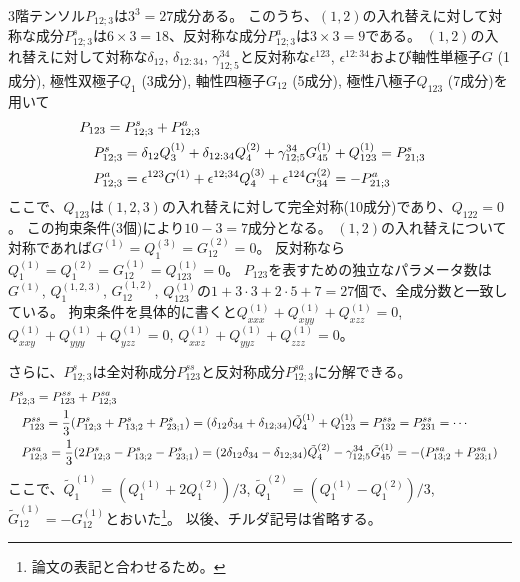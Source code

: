 \documentclass[11pt]{easymemo}
\begin{document}
3階テンソル$P_{12;3}$は$3^3=27$成分ある。
このうち、$(1,2)$の入れ替えに対して対称な成分$P_{12;3}^s$は$6\times3=18$、反対称な成分$P_{12;3}^a$は$3\times3=9$である。
$(1,2)$の入れ替えに対して対称な$\delta_{12}$, $\delta_{12:34}$, $\gamma_{12;5}^{34}$と反対称な$\epsilon^{123}$, $\epsilon^{12:34}$および軸性単極子$G$ (1成分), 極性双極子$Q_1$ (3成分), 軸性四極子$G_{12}$ (5成分), 極性八極子$Q_{123}$ (7成分)を用いて
\begin{align}
&
P_{123}=P_{12;3}^s+P_{12;3}^a
\cr&\quad
P_{12;3}^s=\delta_{12}Q_3^{(1)}+\delta_{12:34}Q_4^{(2)}+\gamma_{12;5}^{34}G_{45}^{(1)}
+Q_{123}^{(1)}
=P_{21;3}^s
\cr&\quad
P_{12;3}^a=\epsilon^{123}G^{(1)}+\epsilon^{12;34}Q_4^{(3)}
+\epsilon^{124}G_{34}^{(2)}
=-P_{21;3}^a
\label{decomp3}
\end{align}
ここで、$Q_{123}$は$(1,2,3)$の入れ替えに対して完全対称(10成分)であり、$Q_{122}=0$。
この拘束条件(3個)により$10-3=7$成分となる。
$(1,2)$の入れ替えについて対称であれば$G^{(1)}=Q_1^{(3)}=G_{12}^{(2)}=0$。
反対称なら$Q_1^{(1)}=Q_1^{(2)}=G_{12}^{(1)}=Q_{123}^{(1)}=0$。
$P_{123}$を表すための独立なパラメータ数は$G^{(1)}$, $Q_1^{(1,2,3)}$, $G_{12}^{(1,2)}$, $Q_{123}^{(1)}$の$1+3\cdot 3+2\cdot 5+7=27$個で、全成分数と一致している。
拘束条件を具体的に書くと$Q_{xxx}^{(1)}+Q_{xyy}^{(1)}+Q_{xzz}^{(1)}=0$, $Q_{xxy}^{(1)}+Q_{yyy}^{(1)}+Q_{yzz}^{(1)}=0$, $Q_{xxz}^{(1)}+Q_{yyz}^{(1)}+Q_{zzz}^{(1)}=0$。

さらに、$P_{12;3}^s$は全対称成分$P_{123}^{ss}$と反対称成分$P_{12;3}^{sa}$に分解できる。
\begin{align}
&
P_{12;3}^s=P_{123}^{ss}+P_{12;3}^{sa}
\cr&\quad
P_{123}^{ss}=\frac{1}{3}(P_{12;3}^s+P_{13;2}^s+P_{23;1}^s)
=(\delta_{12}\delta_{34}+\delta_{12;34})\tilde{Q}_{4}^{(1)}+Q_{123}^{(1)}
=P_{132}^{ss}=P_{231}^{ss}=\cdots
\cr&\quad
P_{12;3}^{sa}=\frac{1}{3}(2P_{12;3}^s-P_{13;2}^s-P_{23;1}^s)
=(2\delta_{12}\delta_{34}-\delta_{12;34})\tilde{Q}_4^{(2)}-\gamma_{12;5}^{34}\tilde{G}_{45}^{(1)}
=-(P_{13;2}^{sa}+P_{23;1}^{sa})
\end{align}
ここで、$\tilde{Q}_1^{(1)}=(Q_1^{(1)}+2Q_1^{(2)})/3$, $\tilde{Q}_1^{(2)}=(Q_1^{(1)}-Q_1^{(2)})/3$, $\tilde{G}_{12}^{(1)}=-G_{12}^{(1)}$とおいた\footnote{論文\cite{Yatsushiro22a,Hayami2024}の表記と合わせるため。}。
以後、チルダ記号は省略する。
\end{document}
